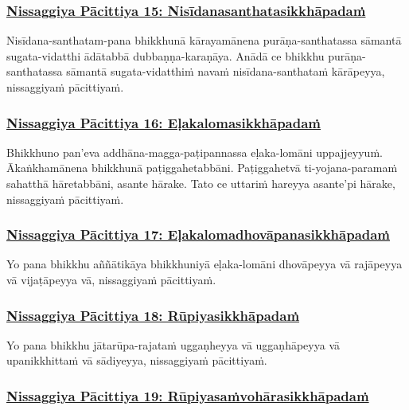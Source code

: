 \subsubsection*{\hyperref[forf-exp15]{Nissaggiya Pācittiya 15: Nisīdanasanthatasikkhāpadaṁ}}
\label{np15}

Nisīdana-santhatam-pana bhikkhunā kārayamānena purāṇa-santhatassa sāmantā sugata-vidatthi ādātabbā dubbaṇṇa-karaṇāya. Anādā ce bhikkhu purāṇa-santhatassa sāmantā sugata-vidatthiṁ navaṁ nisīdana-santhataṁ kārāpeyya, nissaggiyaṁ pācittiyaṁ.

\subsubsection*{\hyperref[forf-exp16]{Nissaggiya Pācittiya 16: Eḷakalomasikkhāpadaṁ}}
\label{np16}

Bhikkhuno pan'eva addhāna-magga-paṭipannassa eḷaka-lomāni uppajjeyyuṁ. Ākaṅkhamānena bhikkhunā paṭiggahetabbāni. Paṭiggahetvā ti-yojana-paramaṁ sahatthā hāretabbāni, asante hārake. Tato ce uttariṁ hareyya asante'pi hārake, nissaggiyaṁ pācittiyaṁ.

\subsubsection*{\hyperref[forf-exp17]{Nissaggiya Pācittiya 17: Eḷakalomadhovāpanasikkhāpadaṁ}}
\label{np17}

Yo pana bhikkhu aññātikāya bhikkhuniyā eḷaka-lomāni dhovāpeyya vā rajāpeyya vā vijaṭāpeyya vā, nissaggiyaṁ pācittiyaṁ.

\subsubsection*{\hyperref[forf-exp18]{Nissaggiya Pācittiya 18: Rūpiyasikkhāpadaṁ}}
\label{np18}

Yo pana bhikkhu jātarūpa-rajataṁ uggaṇheyya vā uggaṇhāpeyya vā upanikkhittaṁ vā sādiyeyya, nissaggiyaṁ pācittiyaṁ.

\subsubsection*{\hyperref[forf-exp19]{Nissaggiya Pācittiya 19: Rūpiyasaṁvohārasikkhāpadaṁ}}
\label{np19}

